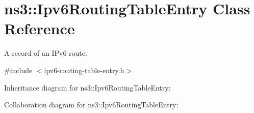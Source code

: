 \hypertarget{classns3_1_1Ipv6RoutingTableEntry}{}\section{ns3\+:\+:Ipv6\+Routing\+Table\+Entry Class Reference}
\label{classns3_1_1Ipv6RoutingTableEntry}


A record of an I\+Pv6 route.  




{\ttfamily \#include $<$ipv6-\/routing-\/table-\/entry.\+h$>$}



Inheritance diagram for ns3\+:\+:Ipv6\+Routing\+Table\+Entry\+:


Collaboration diagram for ns3\+:\+:Ipv6\+Routing\+Table\+Entry\+:
